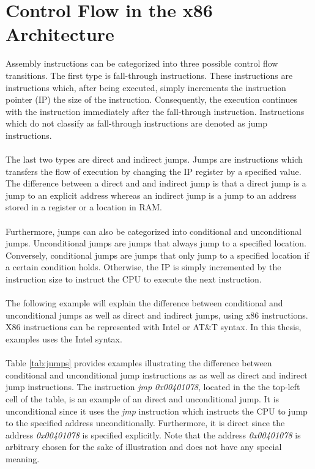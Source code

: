 \documentclass{kththesis}
\begin{document}
\section{Control Flow in the x86 Architecture}
Assembly instructions can be categorized into three possible control flow transitions\cite{CFGFromPowerPC}. The first type is fall-through instructions. These instructions are instructions which, after being executed, simply increments the instruction pointer (IP) the size of the instruction. Consequently, the execution continues with the instruction immediately after the fall-through instruction. Instructions which do not classify as fall-through instructions are denoted as jump instructions. 
\\ \\
The last two types are direct and indirect jumps. Jumps are instructions which transfers the flow of execution by changing the IP register by a specified value. The difference between a direct and and indirect jump is that a direct jump is a jump to an explicit address whereas an indirect jump is a jump to an address stored in a register or a location in RAM. 
\\ \\
Furthermore, jumps can also be categorized into conditional and unconditional jumps. Unconditional jumps are jumps that always jump to a specified location. Conversely, conditional jumps are jumps that only jump to a specified location if a certain condition holds. Otherwise, the IP is simply incremented by the instruction size to instruct the CPU to execute the next instruction. 
\\ \\
The following example will explain the difference between conditional and unconditional jumps as well as direct and indirect jumps, using x86 instructions. X86 instructions can be represented with Intel or AT\&T syntax. In this thesis, examples uses the Intel syntax.
\\ \\ 
Table \ref{tab:jumps} provides examples illustrating the difference between conditional and unconditional jump instructions as as well as direct and indirect jump instructions. The instruction \textit{jmp 0x00401078}, located in the the top-left cell of the table, is an example of an direct and unconditional jump. It is unconditional since it uses the \textit{jmp} instruction which instructs the CPU to jump to the specified address unconditionally. Furthermore, it is direct since the address \textit{0x00401078} is specified explicitly. Note that the address \textit{0x00401078} is arbitrary chosen for the sake of illustration and does not have any special meaning.
\end{document}
